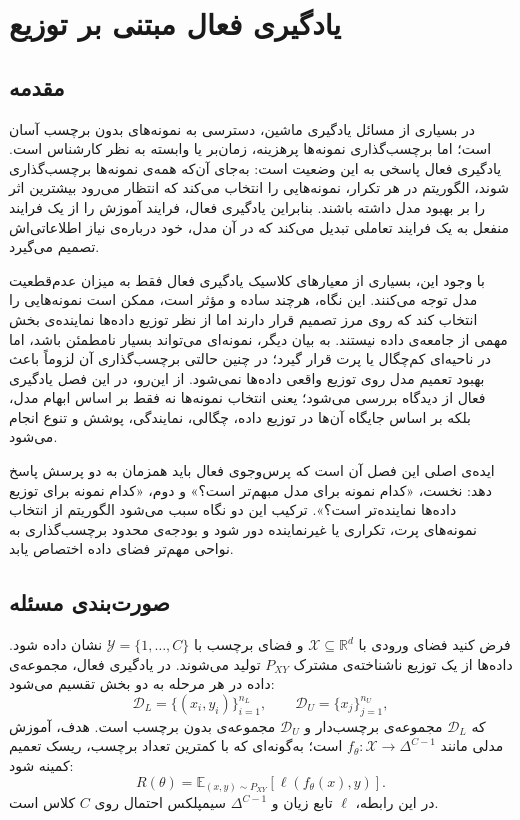 \documentclass[12pt,a4paper,oneside]{report}
\newcommand{\R}{\mathbb{R}}
\newcommand{\E}{\mathbb{E}}
\newcommand{\cD}{\mathcal{D}}
\newcommand{\cX}{\mathcal{X}}
\newcommand{\cY}{\mathcal{Y}}
\begin{document}
\chapter{یادگیری فعال مبتنی بر توزیع}
\label{chap:distribution_active_learning}

\section{مقدمه}
\label{sec:dal_intro}

در بسیاری از مسائل یادگیری ماشین، دسترسی به نمونه‌های بدون برچسب آسان است؛ اما برچسب‌گذاری نمونه‌ها پرهزینه، زمان‌بر یا وابسته به نظر کارشناس است. یادگیری فعال پاسخی به این وضعیت است: به‌جای آن‌که همه‌ی نمونه‌ها برچسب‌گذاری شوند، الگوریتم در هر تکرار، نمونه‌هایی را انتخاب می‌کند که انتظار می‌رود بیشترین اثر را بر بهبود مدل داشته باشند. بنابراین یادگیری فعال، فرایند آموزش را از یک فرایند منفعل به یک فرایند تعاملی تبدیل می‌کند که در آن مدل، خود درباره‌ی نیاز اطلاعاتی‌اش تصمیم می‌گیرد.

با وجود این، بسیاری از معیارهای کلاسیک یادگیری فعال فقط به میزان عدم‌قطعیت مدل توجه می‌کنند. این نگاه، هرچند ساده و مؤثر است، ممکن است نمونه‌هایی را انتخاب کند که روی مرز تصمیم قرار دارند اما از نظر توزیع داده‌ها نماینده‌ی بخش مهمی از جامعه‌ی داده نیستند. به بیان دیگر، نمونه‌ای می‌تواند بسیار نامطمئن باشد، اما در ناحیه‌ای کم‌چگال یا پرت قرار گیرد؛ در چنین حالتی برچسب‌گذاری آن لزوماً باعث بهبود تعمیم مدل روی توزیع واقعی داده‌ها نمی‌شود. از این‌رو، در این فصل یادگیری فعال از دیدگاه  بررسی می‌شود؛ یعنی انتخاب نمونه‌ها نه فقط بر اساس ابهام مدل، بلکه بر اساس جایگاه آن‌ها در توزیع داده، چگالی، نمایندگی، پوشش و تنوع انجام می‌شود.

ایده‌ی اصلی این فصل آن است که پرس‌وجوی فعال باید همزمان به دو پرسش پاسخ دهد: نخست، «کدام نمونه برای مدل مبهم‌تر است؟» و دوم، «کدام نمونه برای توزیع داده‌ها نماینده‌تر است؟». ترکیب این دو نگاه سبب می‌شود الگوریتم از انتخاب نمونه‌های پرت، تکراری یا غیرنماینده دور شود و بودجه‌ی محدود برچسب‌گذاری به نواحی مهم‌تر فضای داده اختصاص یابد.

\section{صورت‌بندی مسئله}
\label{sec:dal_problem}

فرض کنید فضای ورودی با $\cX \subseteq \R^d$ و فضای برچسب با $\cY=\{1,\ldots,C\}$ نشان داده شود. داده‌ها از یک توزیع ناشناخته‌ی مشترک $P_{XY}$ تولید می‌شوند. در یادگیری فعال، مجموعه‌ی داده در هر مرحله به دو بخش تقسیم می‌شود:
\begin{equation}
\cD_L=\{(x_i,y_i)\}_{i=1}^{n_L},
\qquad
\cD_U=\{x_j\}_{j=1}^{n_U},
\end{equation}
که $\cD_L$ مجموعه‌ی برچسب‌دار و $\cD_U$ مجموعه‌ی بدون برچسب است. هدف، آموزش مدلی مانند $f_\theta:\cX\rightarrow \Delta^{C-1}$ است؛ به‌گونه‌ای که با کمترین تعداد برچسب، ریسک تعمیم کمینه شود:
\begin{equation}
R(\theta)=\E_{(x,y)\sim P_{XY}}\left[\ell(f_\theta(x),y)\right].
\end{equation}
در این رابطه، $\ell$ تابع زیان و $\Delta^{C-1}$ سیمپلکس احتمال روی $C$ کلاس است.
\end{document}
